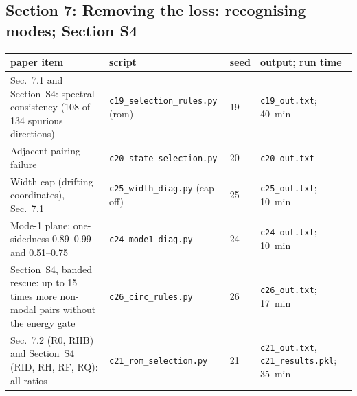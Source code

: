 \documentclass[10pt]{article}
\newcommand{\f}[1]{\texttt{#1}}
\begin{document}
\subsection*{Section 7: Removing the loss: recognising modes; Section S4}
\begin{longtable}{L{0.31\textwidth}L{0.25\textwidth}L{0.08\textwidth}L{0.25\textwidth}}
\toprule
paper item & script & seed & output; run time\\ \midrule
Sec.~7.1 and Section~S4: spectral consistency (108 of 134 spurious directions) & \f{c19\_\allowbreak{}selection\_\allowbreak{}rules.py} (rom) & 19 & \f{c19\_\allowbreak{}out.txt}; 40~min\\
Adjacent pairing failure & \f{c20\_\allowbreak{}state\_\allowbreak{}selection.py} & 20 & \f{c20\_\allowbreak{}out.txt}\\
Width cap (drifting coordinates), Sec.~7.1 & \f{c25\_\allowbreak{}width\_\allowbreak{}diag.py} (cap off) & 25 & \f{c25\_\allowbreak{}out.txt}; 10~min\\
Mode-1 plane; one-sidedness 0.89--0.99 and 0.51--0.75 & \f{c24\_\allowbreak{}mode1\_\allowbreak{}diag.py} & 24 & \f{c24\_\allowbreak{}out.txt}; 10~min\\
Section~S4, banded rescue: up to 15 times more non-modal pairs without the energy gate & \f{c26\_\allowbreak{}circ\_\allowbreak{}rules.py} & 26 & \f{c26\_\allowbreak{}out.txt}; 17~min\\
Sec.~7.2 (R0, RHB) and Section~S4 (RID, RH, RF, RQ): all ratios & \f{c21\_\allowbreak{}rom\_\allowbreak{}selection.py} & 21 & \f{c21\_\allowbreak{}out.txt}, \f{c21\_\allowbreak{}results.pkl}; 35~min\\
\bottomrule
\end{longtable}
\end{document}
